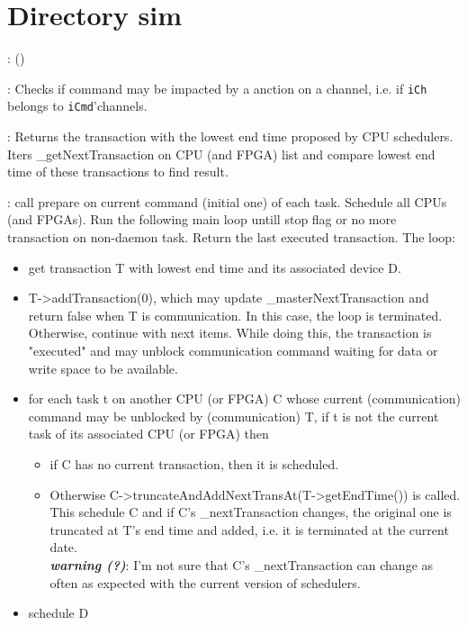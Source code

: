 \documentclass[a4paper,11pt]{article}
\newcommand{\bfont}{\fontseries{b}\selectfont}
\newcommand{\cod}[1]{{\ttfamily #1}}
\newcommand{\class}[2]{\par\vspace{1mm}\hspace{-5mm}\large\colorbox{file}{\textbullet\bfont\cod{#1}:} (\cod{#2})\par}
\newcommand{\method}[1]{\par\vspace{1mm}\hspace{-2mm}\colorbox{method}{\textopenbullet\bfont\cod{#1}:}}
\begin{document}
\section*{Directory \cod{sim}}
\class{Simulator}{}

\method{channelImpactsCommand(iCh,iCmd)} Checks if command may be impacted by a anction on a channel, i.e. if {\tt iCh} belongs to {\tt iCmd}'channels.

\method{getTransLowestEndTime(oResultDevice)} Returns the transaction with the lowest end time proposed by CPU schedulers. Iters \cod{\_getNextTransaction} on CPU (and FPGA) list and compare lowest end time of these transactions to find result.

\method{simulate(oLastTrans)} call \cod{prepare} on current command (initial one) of each task. Schedule all CPUs (and FPGAs). Run the following main loop untill stop flag or no more transaction on non-daemon task. Return the last executed transaction. The loop:
\begin{itemize}
	\item get transaction \cod{T} with lowest end time and its associated device \cod{D}.
	\item \cod{T->addTransaction(0)}, which may update \cod{\_masterNextTransaction} and return false when \cod{T} is communication. In this case, the loop is terminated. Otherwise, continue with next items. While doing this, the transaction is "executed" and may unblock communication command waiting for data or write space to be available.
	\item for each task \cod{t} on another CPU (or FPGA) \cod{C} whose current (communication) command may be unblocked by (communication) \cod{T}, if \cod{t} is not the current task of its associated CPU (or FPGA) then
	\begin{itemize}
	\item if \cod{C} has no current transaction, then it is scheduled.
	\item Otherwise \cod{C->truncateAndAddNextTransAt(T->getEndTime())} is called. This schedule \cod{C} and if \cod{C}'s \cod{\_nextTransaction} changes, the original one is truncated at \cod{T}'s end time and added, i.e. it is terminated at the current date.\\
	{\bfseries\textit{warning (?)}}: I'm not sure that \cod{C}'s \cod{\_nextTransaction} can change as often as expected with the current version of schedulers.
	\end{itemize}
	\item schedule \cod{D}
\end{itemize}
\end{document}
